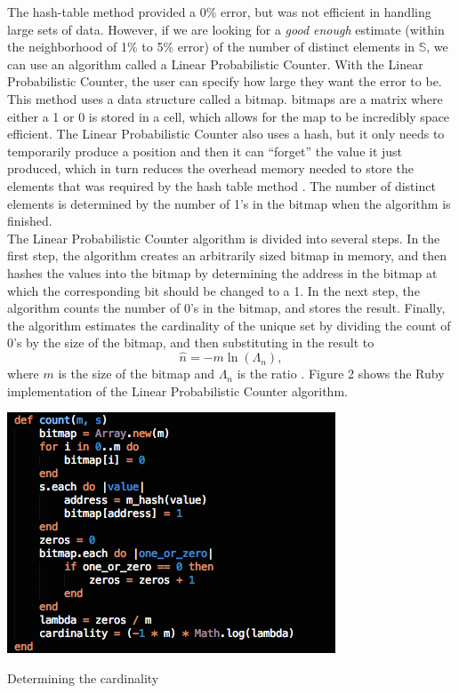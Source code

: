 \documentclass{article}
\begin{document}
\indent The hash-table method provided a 0\% error, but was not efficient in handling large sets of data. However, if we are looking for a \textit{good enough} estimate (within the neighborhood of 1\% to 5\% error) of the number of distinct elements in $\mathbb{S}$, we can use an algorithm called a Linear Probabilistic Counter. With the Linear Probabilistic Counter, the user can specify how large they want the error to be. This method uses a data structure called a bitmap. bitmaps are a matrix where either a 1 or 0 is stored in a cell, which allows for the map to be incredibly space efficient. The Linear Probabilistic Counter also uses a hash, but it only needs to temporarily produce a position and then it can ``forget'' the value it just produced, which in turn reduces the overhead memory needed to store the elements that was required by the hash table method \cite{Whang}. The number of distinct elements is determined by the number of 1's in the bitmap when the algorithm is finished.\\
\indent The Linear Probabilistic Counter algorithm is divided into several steps. In the first step, the algorithm creates an arbitrarily sized bitmap in memory, and then hashes the values into the bitmap by determining the address in the bitmap at which the corresponding bit should be changed to a 1.
In the next step, the algorithm counts the number of 0's in the bitmap, and stores the result.
Finally, the algorithm estimates the cardinality of the unique set by dividing the count of 0's by the size of the bitmap, and then substituting in the result to
\[
\hat{n} = -m \ln{(\Lambda_{n})},
\]
where $m$ is the size of the bitmap and $\Lambda_{n}$ is the ratio \cite{Whang}. 
Figure 2 shows the Ruby implementation of the Linear Probabilistic Counter algorithm.
\begin{floatingfigure}[R]{6cm}
\begin{framed}
\centering
\includegraphics[scale=0.4]{fb_problem/lpc}
\caption{Determining the cardinality}
\end{framed}
\end{floatingfigure}
\end{document}
